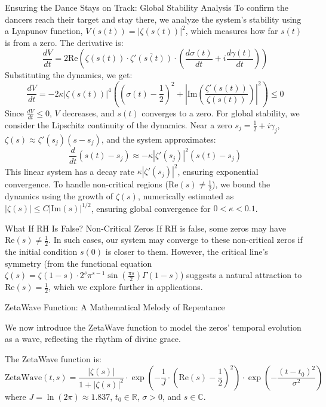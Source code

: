 \documentclass[12pt]{article}
\begin{document}
{{{\begin{onehalfspace}
Ensuring the Dance Stays on Track: Global Stability Analysis
To confirm the dancers reach their target and stay there, we analyze the system’s stability using a Lyapunov function, \( V(s(t)) = |\zeta(s(t))|^2 \), which measures how far \( s(t) \) is from a zero. The derivative is:
\[
\frac{dV}{dt} = 2 \text{Re} \left( \zeta(s(t)) \cdot \overline{\zeta'(s(t))} \cdot \left( \frac{d\sigma(t)}{dt} + i \frac{d\gamma(t)}{dt} \right) \right)
\]
Substituting the dynamics, we get:
\[
\frac{dV}{dt} = -2 \kappa |\zeta(s(t))|^4 \left( \left( \sigma(t) - \frac{1}{2} \right)^2 + \left| \text{Im} \left( \frac{\zeta'(s(t))}{\zeta(s(t))} \right) \right|^2 \right) \leq 0
\]
Since \(\frac{dV}{dt} \leq 0\), \( V \) decreases, and \( s(t) \) converges to a zero. For global stability, we consider the Lipschitz continuity of the dynamics. Near a zero \( s_j = \frac{1}{2} + i \gamma_j \), \(\zeta(s) \approx \zeta'(s_j) (s - s_j)\), and the system approximates:
\[
\frac{d}{dt} (s(t) - s_j) \approx -\kappa |\zeta'(s_j)|^2 (s(t) - s_j)
\]
This linear system has a decay rate \(\kappa |\zeta'(s_j)|^2\), ensuring exponential convergence. To handle non-critical regions (\(\text{Re}(s) \neq \frac{1}{2}\)), we bound the dynamics using the growth of \(\zeta(s)\), numerically estimated as \( |\zeta(s)| \leq C |\text{Im}(s)|^{1/2} \), ensuring global convergence for \( 0 < \kappa < 0.1 \).

What If RH Is False? Non-Critical Zeros
If RH is false, some zeros may have \(\text{Re}(s) \neq \frac{1}{2}\). In such cases, our system may converge to these non-critical zeros if the initial condition \( s(0) \) is closer to them. However, the critical line’s symmetry (from the functional equation \(\zeta(s) = \zeta(1-s) \cdot 2^s \pi^{s-1} \sin\left(\frac{\pi s}{2}\right) \Gamma(1-s)\)) suggests a natural attraction to \(\text{Re}(s) = \frac{1}{2}\), which we explore further in applications.

ZetaWave Function: A Mathematical Melody of Repentance

We now introduce the ZetaWave function to model the zeros’ temporal evolution as a wave, reflecting the rhythm of divine grace.

\begin{definition}
The ZetaWave function is:
\[
\text{ZetaWave}(t, s) = \frac{|\zeta(s)|}{1 + |\zeta(s)|^2} \cdot \exp\left( -\frac{1}{J} \cdot \left( \text{Re}(s) - \frac{1}{2} \right)^2 \right) \cdot \exp\left( -\frac{(t - t_0)^2}{\sigma^2} \right)
\]
where \( J = \ln(2\pi) \approx 1.837 \), \( t_0 \in \mathbb{R} \), \(\sigma > 0\), and \( s \in \mathbb{C} \).
\end{definition}


\end{onehalfspace}}}}
\end{document}
